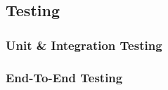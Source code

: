 \subsection{Testing}

\subsubsection{Unit \& Integration Testing}



\subsubsection{End-To-End Testing}


